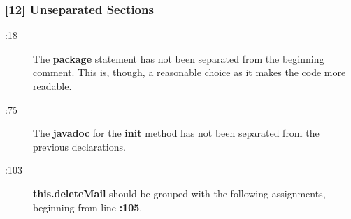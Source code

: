 \subsubsection{[12] Unseparated Sections}
\begin{description}
	\item[:18] The \textbf{package} statement has not been separated from the beginning comment. This is, though, a reasonable choice as it makes the code more readable.
	\item[:75] The \textbf{javadoc} for the \textbf{init} method has not been separated from the previous declarations.
	\item[:103] \textbf{this.deleteMail} should be grouped with the following assignments, beginning from line \textbf{:105}.
\end{description}

